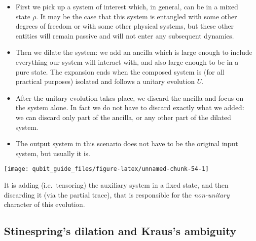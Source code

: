 \documentclass[fleqn]{article}
\providecommand{\tightlist}{%
  \setlength{\itemsep}{0pt}\setlength{\parskip}{0pt}}
\begin{document}
\begin{itemize}
\tightlist
\item
  First we pick up a system of interest which, in general, can be in a mixed state \(\rho\). It may be the case that this system is entangled with some other degrees of freedom or with some other physical systems, but these other entities will remain passive and will not enter any subsequent dynamics.
\item
  Then we dilate the system: we add an ancilla which is large enough to include everything our system will interact with, and also large enough to be in a pure state. The expansion ends when the composed system is (for all practical purposes) isolated and follows a unitary evolution \(U\).
\item
  After the unitary evolution takes place, we discard the ancilla and focus on the system alone. In fact we do not have to discard exactly what we added: we can discard only part of the ancilla, or any other part of the dilated system.
\item
  The output system in this scenario does not have to be the original input system, but usually it is.
\end{itemize}

\begin{center}\texttt{[image: qubit\_guide\_files/figure-latex/unnamed-chunk-54-1]} \end{center}

It is adding (i.e.~tensoring) the auxiliary system in a fixed state, and then discarding it (via the partial trace), that is responsible for the \emph{non-unitary} character of this evolution.

\hypertarget{stinesprings-dilation-and-krauss-ambiguity}{%
\subsection{Stinespring's dilation and Kraus's ambiguity}\label{stinesprings-dilation-and-krauss-ambiguity}}
\end{document}
